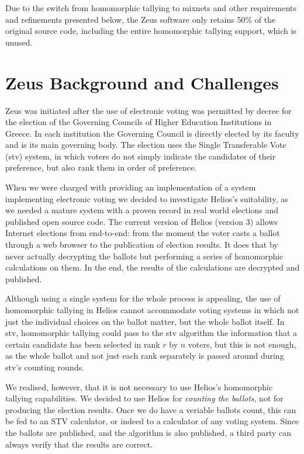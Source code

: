 \documentclass[letterpaper,10pt]{article}
\begin{document}
Due to the switch from homomorphic tallying to mixnets and other
requirements and refinements presented below, the Zeus software only
retains 50\% of the original source code, including the entire
homomorphic tallying support, which is unused.

\section{Zeus Background and Challenges}
\label{sec:challenges}

Zeus was initiated after the use of electronic voting was permitted by
decree for the election of the Governing Councils of Higher Education
Institutions in Greece. In each institution the Governing Council is
directly elected by its faculty and is its main governing body. The
election uses the Single Transferable Vote ({\sc stv}) system, in which
voters do not simply indicate the candidates of their preference, but
also rank them in order of preference. 

When we were charged with providing an implementation of a system
implementing electronic voting we decided to investigate Helios's
suitability, as we needed a mature system with a proven record in real
world elections and published open source code. The current version of
Helios (version 3) allows Internet elections from end-to-end: from the
moment the voter casts a ballot through a web browser to the
publication of election results. It does that by never actually
decrypting the ballots but performing a series of homomorphic
calculations on them. In the end, the results of the calculations are
decrypted and published. 

Although using a single system for the whole process is appealing, the
use of homomorphic tallying in Helios cannot accommodate voting
systems in which not just the individual choices on the ballot matter,
but the whole ballot itself. In {\sc stv}, homomorphic tallying could pass
to the {\sc stv} algorithm the information that a certain candidate has been
selected in rank $r$ by $n$ voters, but this is not enough, as the whole
ballot and not just each rank separately is passed around during {\sc stv}'s
counting rounds.

We realised, however, that it is not necessary to use Helios's
homomorphic tallying capabilities. We decided to use Helios for
\emph{counting the ballots}, not for producing the election results.
Once we do have a veriable ballots count, this can be fed to an STV
calculator, or indeed to a calculator of any voting system. Since the
ballots are published, and the algorithm is also published, a third
party can always verify that the results are correct.
\end{document}
